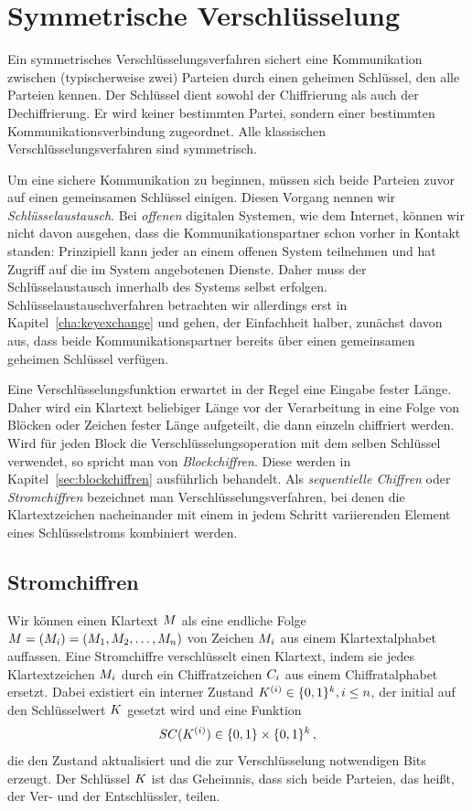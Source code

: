 \chapter{Symmetrische Verschlüsselung}
\label{cha:symencryption}
Ein symmetrisches Verschlüsselungsverfahren sichert eine Kommunikation zwischen (typischerweise zwei) Parteien durch einen geheimen Schlüssel, den alle Parteien kennen. Der Schlüssel dient sowohl der Chiffrierung als auch der Dechiffrierung. Er wird keiner bestimmten Partei, sondern einer bestimmten Kommunikationsverbindung zugeordnet. Alle klassischen Verschlüsselungsverfahren sind symmetrisch.

Um eine sichere Kommunikation zu beginnen, müssen sich beide Parteien zuvor auf einen gemeinsamen Schlüssel einigen. Diesen Vorgang nennen wir \emph{Schlüsselaustausch}. Bei \emph{offenen} digitalen Systemen, wie dem Internet, können wir nicht davon ausgehen, dass die Kommunikationspartner schon vorher in Kontakt standen: Prinzipiell kann jeder an einem offenen System teilnehmen und hat Zugriff auf die im System angebotenen Dienste. Daher muss der Schlüsselaustausch innerhalb des Systems selbst erfolgen. Schlüsselaustauschverfahren betrachten wir allerdings erst in Kapitel~\ref{cha:keyexchange} und gehen, der Einfachheit halber, zunächst davon aus, dass beide Kommunikationspartner bereits über einen gemeinsamen geheimen Schlüssel verfügen.

Eine Verschlüsselungsfunktion erwartet in der Regel eine Eingabe fester Länge. Daher wird ein Klartext beliebiger Länge vor der Verarbeitung in eine Folge von Blöcken oder Zeichen fester Länge aufgeteilt, die dann einzeln chiffriert werden. Wird für jeden Block die Verschlüsselungsoperation mit dem selben Schlüssel verwendet, so spricht man von \emph{Blockchiffren}. Diese werden in Kapitel~\ref{sec:blockchiffren} ausführlich behandelt. Als \emph{sequentielle Chiffren} oder \emph{Stromchiffren} bezeichnet man Verschlüsselungsverfahren, bei denen die Klartextzeichen nacheinander mit einem in jedem Schritt variierenden Element eines Schlüsselstroms kombiniert werden.

\section{Stromchiffren}
Wir können einen Klartext $M$ als eine endliche Folge $M = (M_i) = (M_1,M_2,\dots,M_n) $ von Zeichen $M_i$ aus einem Klartextalphabet auffassen. Eine Stromchiffre verschlüsselt einen Klartext, indem sie jedes Klartextzeichen $M_i$ durch ein Chiffratzeichen $C_i$ aus einem Chiffratalphabet ersetzt. Dabei existiert ein interner
Zustand $K^{(i)} \in \{0,1\}^k, i \leq n$, der initial auf den Schlüsselwert $K$ gesetzt wird und eine Funktion
\begin{align*}
	SC(K^{(i)}) \in \{0,1\} \times \{0,1\}^k\, ,
\end{align*}
die den Zustand aktualisiert und die zur Verschlüsselung notwendigen Bits erzeugt. Der Schlüssel $K$ ist das Geheimnis,
dass sich beide Parteien, das heißt, der Ver- und der Entschlüssler, teilen.


